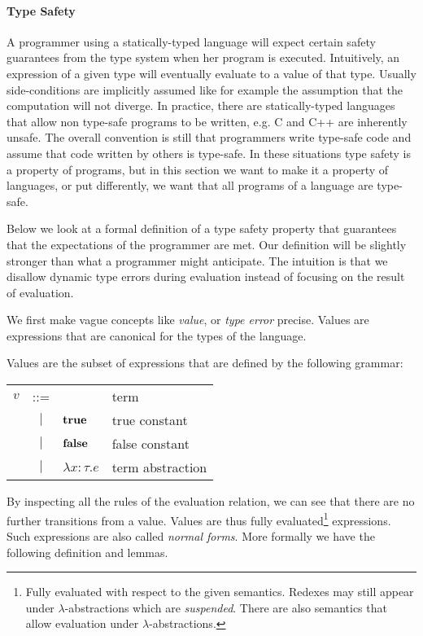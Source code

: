 {\paragraph{Type Safety}

A programmer using a statically-typed language will expect certain safety
guarantees from the type system when her program is executed. Intuitively, an
expression of a given type will eventually evaluate to a value of that
type. Usually side-conditions are implicitly assumed like for example the
assumption that the computation will not diverge. In practice, there are
statically-typed languages that allow non type-safe programs to be written,
e.g. C and C++ are inherently unsafe. The overall convention is still that
programmers write type-safe code and assume that code written by others is
type-safe. In these situations type safety is a property of programs, but in
this section we want to make it a property of languages, or put differently, we
want that all programs of a language are type-safe.

Below we look at a formal definition of a type safety property that guarantees
that the expectations of the programmer are met. Our definition will be slightly
stronger than what a programmer might anticipate. The intuition is that we
disallow dynamic type errors during evaluation instead of focusing on the result
of evaluation.

We first make vague concepts like \emph{value}, or \emph{type error} precise.
Values are expressions that are canonical for the types of the language.

\begin{defn}[Value]
  Values are the subset of expressions that are defined by the following
  grammar:
  \begin{center}
    \begin{tabular}{lcll}
      $v$ & ::=    &                    & term             \\
          & $\mid$ & $\textbf{true}$            & true constant    \\
          & $\mid$ & $\textbf{false}$           & false constant   \\
          & $\mid$ & $\lambda x:\tau.e$ & term abstraction \\
    \end{tabular}
  \end{center}
\end{defn}

By inspecting all the rules of the evaluation relation, we can see that there
are no further transitions from a value. Values are thus fully
evaluated\footnote{Fully evaluated with respect to the given semantics. Redexes
  may still appear under $\lambda$-abstractions which are
  \emph{suspended}. There are also semantics that allow evaluation under
  $\lambda$-abstractions.} expressions. Such expressions are also called
\emph{normal forms}. More formally we have the following definition and lemmas.

}
